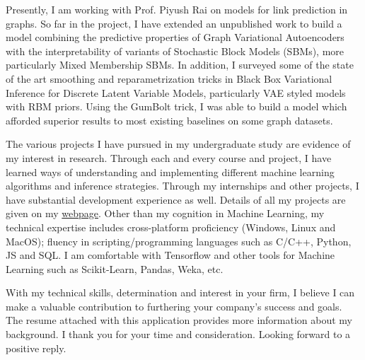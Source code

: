 \documentclass[11pt, letter]{resume}
\begin{document}
\begin{cvletter}
	Presently, I am working with Prof. Piyush Rai on models for link prediction
	in graphs. So far in the project, I have extended an unpublished work to
	build a model combining the predictive properties of Graph Variational
	Autoencoders with the interpretability of variants of Stochastic Block
	Models (SBMs), more particularly Mixed Membership SBMs. In addition, I
	surveyed some of the state of the art smoothing and reparametrization
	tricks in Black Box Variational Inference for Discrete Latent Variable
	Models, particularly VAE styled models with RBM priors. Using the GumBolt
	trick, I was able to build a model which afforded superior results to most
	existing baselines on some graph datasets.

	The various projects I have pursued in my undergraduate study are evidence
	of my interest in research. Through each and every course and project, I
	have learned ways of understanding and implementing different machine
	learning algorithms and inference strategies. Through my internships and
	other projects, I have substantial development experience as well. Details
	of all my projects are given on my {\color{red}
	\href{https://fat-fighter.github.io}{webpage}}. Other than my cognition in
	Machine Learning, my technical expertise includes cross-platform
	proficiency (Windows, Linux and MacOS); fluency in scripting/programming
	languages such as C/C++, Python, JS and SQL. I am comfortable with
	Tensorflow and other tools for Machine Learning such as Scikit-Learn,
	Pandas, Weka, etc.

	With my technical skills, determination and interest in your firm, I
	believe I can make a valuable contribution to furthering your company’s
	success and goals. The resume attached with this application provides more
	information about my background. I thank you for your time and
	consideration. Looking forward to a positive reply.

\end{cvletter}
\makeletterclosing
\end{document}
